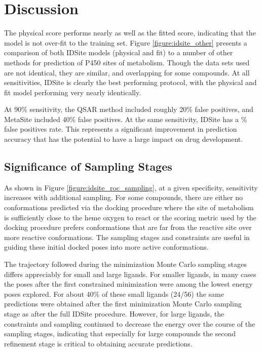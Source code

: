 \section{Discussion}
\label{section:p450/discussion}
The physical score performs nearly as well as the fitted score, indicating that the model is not over-fit to the training set.
Figure \ref{figure:idsite_other} presents a comparison of both IDSite models (physical and fit) to a number of other methods for prediction of P450 sites of metabolism.
Though the data sets used are not identical, they are similar, and overlapping for some compounds.
At all sensitivities, IDSite is clearly the best performing protocol, with the physical and fit model performing very nearly identically.

At 90\% sensitivity, the QSAR method included roughly 20\% false positives, and MetaSite included 40\% false positives.
At the same sensitivity, IDSite has a \% false positives rate.
This represents a significant improvement in prediction accuracy that has the potential to have a large impact on drug development.

\subsection{Significance of Sampling Stages}
\label{subsection:p450/discussion/sampling_stages}

As shown in Figure \ref{figure:idsite_roc_sampling}, at a given specificity, sensitivity increases with additional sampling.
For some compounds, there are either no conformations predicted via the docking procedure where the site of metabolism is sufficiently close to the heme oxygen to react or the scoring metric used by the docking procedure prefers conformations that are far from the reactive site over more reactive conformations.
The sampling stages and constraints are useful in guiding these initial docked poses into more active conformations.

The trajectory followed during the minimization Monte Carlo sampling stages differs appreciably for small and large ligands.
For smaller ligands, in many cases the poses after the first constrained minimization were among the lowest energy poses explored.
For about 40\% of these small ligands (24/56) the same predictions were obtained after the first minimization Monte Carlo sampling stage as after the full IDSite procedure.
However, for large ligands, the constraints and sampling continued to decrease the energy over the course of the sampling stages, indicating that especially for large compounds the second refinement stage is critical to obtaining accurate predictions.

